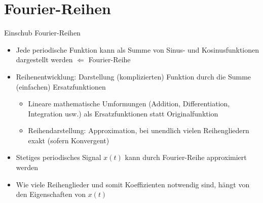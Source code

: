 \documentclass[xcolor=dvipsnames,aspectratio=169]{beamer}
\begin{document}
\section{Fourier-Reihen}
\begin{frame}{Einschub Fourier-Reihen}
\begin{itemize}
	\item Jede periodische Funktion kann als Summe von Sinus- und Kosinusfunktionen dargestellt werden $\Leftarrow$ Fourier-Reihe
	\item Reihenentwicklung: Darstellung (komplizierten) Funktion durch die Summe (einfachen) Ersatzfunktionen
	\begin{itemize}
		\item Lineare mathematische Umformungen (Addition, Differentiation, Integration usw.) als Ersatzfunktionen statt Originalfunktion
		\item Reihendarstellung: Approximation, bei unendlich vielen Reihengliedern exakt (sofern Konvergent)
	\end{itemize}
	\item Stetiges periodisches Signal $x(t)$ kann durch Fourier-Reihe approximiert werden
	\item Wie viele Reihenglieder und somit Koeffizienten notwendig sind, hängt von den Eigenschaften von $x(t)$
\end{itemize}
\end{frame}
\end{document}
